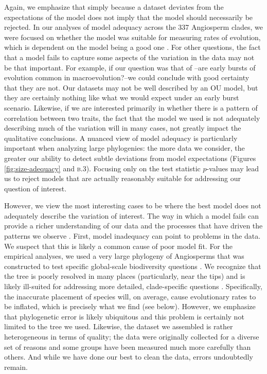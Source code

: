 Again, we emphasize that simply because a dataset deviates from the expectations of the model does not imply that the model should necessarily be rejected. In our analyses of model adequacy across the 337 Angiosperm clades, we were focused on whether the model was suitable for measuring rates of evolution, which is dependent on the model being a good one \citep{Hunt2012}. For other questions, the fact that a model fails to capture some aspects of the variation in the data may not be that important. For example, if our question was that of \citet{Harmon2010}--are early bursts of evolution common in macroevolution?--we could conclude with good certainty that they are not. Our datasets may not be well described by an OU model, but they are certainly nothing like what we would expect under an early burst scenario. Likewise, if we are interested primarily in whether there is a pattern of correlation between two traits, the fact that the model we used is not adequately describing much of the variation will in many cases, not greatly impact the qualitative conclusions. A nuanced view of model adequacy is particularly important when analyzing large phylogenies: the more data we consider, the greater our ability to detect subtle deviations from model expectations (Figures \ref{fig:size-adequacy} and \textsc{b.3}). Focusing only on the test statistic $p$-values may lead us to reject models that are actually reasonably suitable for addressing our question of interest.

However, we view the most interesting cases to be where the best model does not adequately describe the variation of interest. The way in which a model fails can provide a richer understanding of our data and the processes that have driven the patterns we observe \citep{Gelman2012}. First, model inadequacy can point to problems in the data. We suspect that this is likely a common cause of poor model fit. For the empirical analyses, we used a very large phylogeny of Angiosperms that was constructed to test specific global-scale biodiversity questions \citep{Zanne2013}. We recognize that the tree is poorly resolved in many places (particularly, near the tips) and is likely ill-suited for addressing more detailed, clade-specific questions \citep[see the recent critique by][]{DonoghueEdwards}. Specifically, the inaccurate placement of species will, on average, cause evolutionary rates to be inflated, which is precisely what we find (see below). However, we emphasize that phylogenetic error is likely ubiquitous and this problem is certainly not limited to the tree we used. Likewise, the dataset we assembled is rather heterogeneous in terms of quality; the data were originally collected for a diverse set of reasons and some groups have been measured much more carefully than others. And while we have done our best to clean the data, errors undoubtedly remain. 

